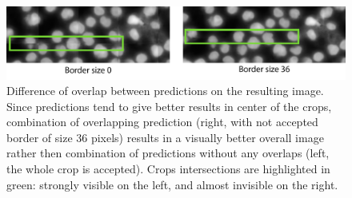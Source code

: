 \begin{figure}[htb]
	\begin{center}
		\includegraphics[width=\linewidth]{bilder/crops_combination/crops-combination.png}
		\caption[Difference of overlap between predictions on the resulting image]%
		{Difference of overlap between predictions on the resulting image. Since predictions tend to give better results in center of the crops, combination of overlapping prediction (right, with not accepted border of size $36$ pixels) results in a visually better overall image rather then combination of predictions without any overlaps (left, the whole crop is accepted). Crops intersections are highlighted in green: strongly visible on the left, and almost invisible on the right.}\label{fig:crops-combination}
	\end{center}
\end{figure}